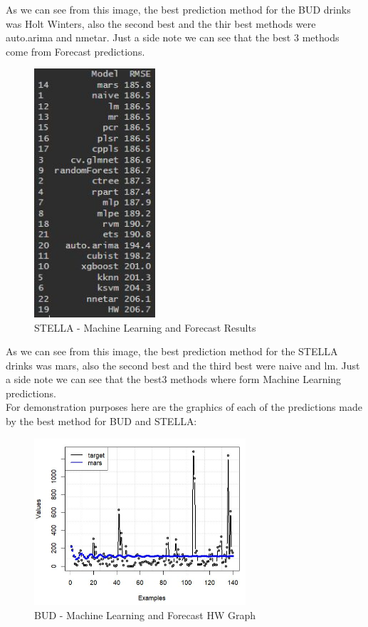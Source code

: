 As we can see from this image, the best prediction method for the BUD drinks was Holt Winters, also the second best and the thir best methods were auto.arima and nmetar. Just a side note we can see that the best 3 methods come from Forecast predictions.\\

\begin{figure}[H]
    \centering
    \includegraphics[width=0.4\textwidth]{assets/stella-split.jpeg}
    \caption{STELLA - Machine Learning and Forecast Results}
    \label{fig:split_stella}
    \end{figure}

As we can see from this image, the best prediction method for the STELLA drinks was mars, also the second best and the third best were naive and lm. Just a side note we can see that the best3 methods where form Machine Learning predictions.\\

For demonstration purposes here are the graphics of each of the predictions made by the best method for BUD and STELLA:

\begin{figure}[H]
    \centering
    \includegraphics[width=0.7\textwidth]{assets/bud-split-graph.jpeg}
    \caption{BUD - Machine Learning and Forecast HW Graph}
    \label{fig:mulivariate_dataset}
    \end{figure}

